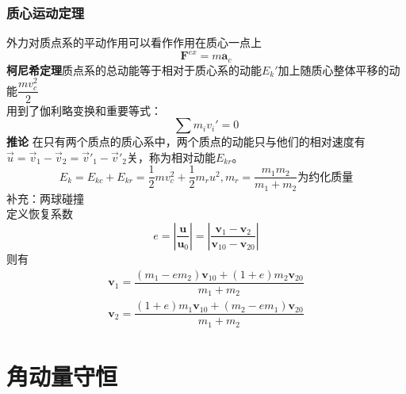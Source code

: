 \subsubsection{质心运动定理}
外力对质点系的平动作用可以看作作用在质心一点上
\begin{equation}\label{key}
	\bm{F}^{ex}=m\bm{a}_c
\end{equation}
\textbf{柯尼希定理}\quad 质点系的总动能等于相对于质心系的动能$E_k'$加上随质心整体平移的动能$\dfrac{mv_c^2}{2}$\\
用到了伽利略变换和重要等式：
\begin{equation}\label{key}
	\sum m_iv_i'=0
\end{equation}
\textbf{推论} \quad 在只有两个质点的质心系中，两个质点的动能只与他们的相对速度有$ \vec{u}=\vec{v}_1-\vec{v}_2=\vec{v}'_1-\vec{v}'_2 $关，称为相对动能$E_{kr}$。
\begin{equation}\label{key}
	E_k=E_{kc}+E_{kr}=\dfrac{1}{2}mv_c^2+\dfrac{1}{2}m_ru^2,m_r=\dfrac{m_1m_2}{m_1+m_2}\text{为约化质量}
\end{equation}
补充：两球碰撞\\
定义恢复系数
\begin{equation}\label{key}
	e=|\dfrac{\bm{u}}{\bm{u}_0}|=|\dfrac{\bm{v}_1-\bm{v}_2}{\bm{v}_{10}-\bm{v}_{20}}|
\end{equation}
则有
\begin{align}
	\bm{v}_1=\dfrac{(m_1-em_2)\bm{v}_{10}+(1+e)m_2\bm{v}_{20}}{m_1+m_2}\\
		\bm{v}_2=\dfrac{(1+e)m_1\bm{v}_{10}+(m_2-em_1)\bm{v}_{20}}{m_1+m_2}
\end{align}

\section{角动量守恒}
